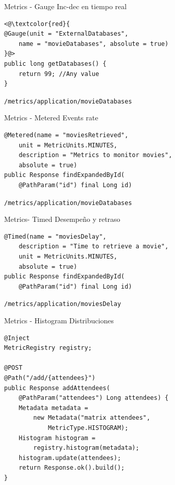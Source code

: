 \documentclass[aspectratio=169]{beamer}
\begin{document}
\begin{frame}[fragile]{Metrics - Gauge}
Inc-dec en tiempo real
\begin{lstlisting}
<@\textcolor{red}{
@Gauge(unit = "ExternalDatabases",
	name = "movieDatabases", absolute = true)
}@>
public long getDatabases() {
	return 99; //Any value
}
\end{lstlisting}

\lstinline|/metrics/application/movieDatabases|
\end{frame}

\begin{frame}[fragile]{Metrics - Metered}
Events rate
\begin{lstlisting}
@Metered(name = "moviesRetrieved",
	unit = MetricUnits.MINUTES,
	description = "Metrics to monitor movies",
	absolute = true)
public Response findExpandedById(
	@PathParam("id") final Long id)
\end{lstlisting}

\lstinline|/metrics/application/movieDatabases|
\end{frame}

\begin{frame}[fragile]{Metrics- Timed}
Desempeño y retraso
\begin{lstlisting}
@Timed(name = "moviesDelay",
	description = "Time to retrieve a movie",
	unit = MetricUnits.MINUTES,
	absolute = true)
public Response findExpandedById(
	@PathParam("id") final Long id)
\end{lstlisting}

\lstinline|/metrics/application/moviesDelay|
\end{frame}

\begin{frame}[fragile]{Metrics - Histogram}
Distribuciones
\begin{lstlisting}
@Inject
MetricRegistry registry;

@POST
@Path("/add/{attendees}")
public Response addAttendees(
	@PathParam("attendees") Long attendees) {
	Metadata metadata =
		new Metadata("matrix attendees",
			MetricType.HISTOGRAM);
	Histogram histogram =
		registry.histogram(metadata);
	histogram.update(attendees);
	return Response.ok().build();
}
\end{lstlisting}

\end{frame}
\end{document}
